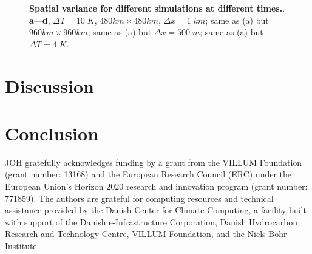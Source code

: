 \documentclass[draft,linenumbers]{agujournal2019}
\begin{document}
\begin{figure}
\caption{{\bf Spatial variance for different simulations at different times.}. 
{\bf a}---{\bf d}, $\Delta T=10\;K$, $480km\times 480km$, $\Delta x=1\;km$; same as (a) but $960km\times 960km$; same as (a) but $\Delta x=500\;m$; same as (a) but $\Delta T=4\;K$.
}
\label{fig:daily_sum_500m}
\end{figure}

\section{Discussion}\label{sec:discussions}

\section{Conclusion}\label{sec:conclusion}


\acknowledgments
JOH gratefully acknowledges funding by a grant from the VILLUM Foundation (grant number: 13168) and the European Research Council (ERC) under the European Union's Horizon 2020 research and innovation program (grant number: 771859).
The authors are grateful for computing resources and technical assistance provided by the Danish Center for Climate Computing, a facility built with support of the Danish e-Infrastructure Corporation, Danish Hydrocarbon Research and Technology Centre, VILLUM Foundation, and the Niels Bohr Institute.





%
%
%
%
%
\end{document}
